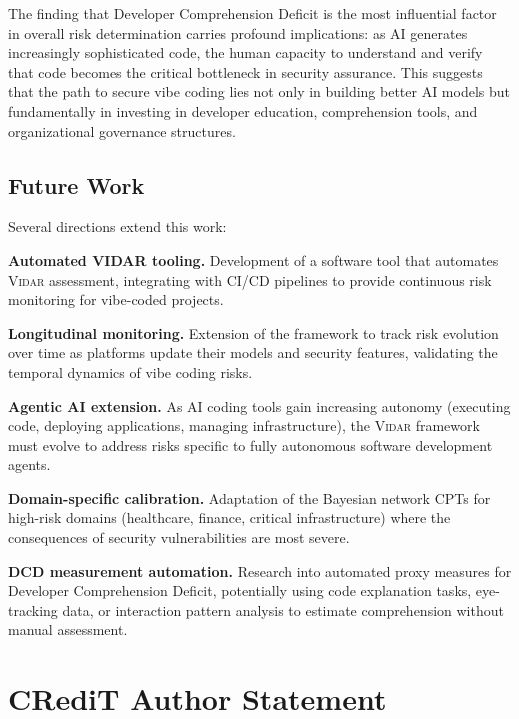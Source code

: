 \documentclass[preprint,review,12pt]{elsarticle}
\newcommand{\vidar}{\textsc{Vidar}}
\begin{document}
The finding that Developer Comprehension Deficit is the most influential factor in overall risk determination carries profound implications: as AI generates increasingly sophisticated code, the human capacity to understand and verify that code becomes the critical bottleneck in security assurance. This suggests that the path to secure vibe coding lies not only in building better AI models but fundamentally in investing in developer education, comprehension tools, and organizational governance structures.

\subsection{Future Work}
\label{subsec:future}

Several directions extend this work:

\textbf{Automated VIDAR tooling.} Development of a software tool that automates \vidar{} assessment, integrating with CI/CD pipelines to provide continuous risk monitoring for vibe-coded projects.

\textbf{Longitudinal monitoring.} Extension of the framework to track risk evolution over time as platforms update their models and security features, validating the temporal dynamics of vibe coding risks.

\textbf{Agentic AI extension.} As AI coding tools gain increasing autonomy (executing code, deploying applications, managing infrastructure), the \vidar{} framework must evolve to address risks specific to fully autonomous software development agents.

\textbf{Domain-specific calibration.} Adaptation of the Bayesian network CPTs for high-risk domains (healthcare, finance, critical infrastructure) where the consequences of security vulnerabilities are most severe.

\textbf{DCD measurement automation.} Research into automated proxy measures for Developer Comprehension Deficit, potentially using code explanation tasks, eye-tracking data, or interaction pattern analysis to estimate comprehension without manual assessment.


\section*{CRediT Author Statement}
\end{document}
